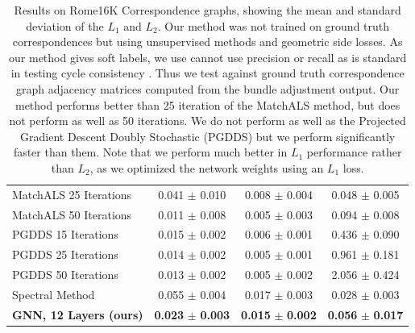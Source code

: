 \documentclass[10pt,twocolumn,letterpaper]{article}
\begin{document}
\begin{table}
\begin{center}
\begin{tabular}{|l|c|c|c|}
MatchALS \cite{zhou2015multi} 25 Iterations                              & 0.041 $\pm$ 0.010                   & 0.008 $\pm$ 0.004                   & 0.048 $\pm$ 0.005                   \\
MatchALS \cite{zhou2015multi} 50 Iterations                              & 0.011 $\pm$ 0.008                   & 0.005 $\pm$ 0.003                   & 0.094 $\pm$ 0.008                   \\ \hline
PGDDS \cite{leonardos2016distributed} 15 Iterations                      & 0.015 $\pm$ 0.002                   & 0.006 $\pm$ 0.001                   & 0.436 $\pm$ 0.090                   \\
PGDDS \cite{leonardos2016distributed} 25 Iterations                      & 0.014 $\pm$ 0.002                   & 0.005 $\pm$ 0.001                   & 0.961 $\pm$ 0.181                   \\
PGDDS \cite{leonardos2016distributed} 50 Iterations                      & 0.013 $\pm$ 0.002                   & 0.005 $\pm$ 0.002                   & 2.056 $\pm$ 0.424                   \\ \hline
Spectral Method                                                          & 0.055 $\pm$ 0.004                   & 0.017 $\pm$ 0.003                   & 0.028 $\pm$ 0.003                   \\ \hline
\textbf{GNN, 12 Layers (ours)}                                           & \textbf{0.023} $\pm$ \textbf{0.003} & \textbf{0.015} $\pm$ \textbf{0.002} & \textbf{0.056} $\pm$ \textbf{0.017} \\ \hline
\end{tabular}
\end{center}


\caption{
Results on Rome16K Correspondence graphs, showing the mean and standard deviation of the $L_1$ and $L_2$.
Our method was not trained on ground truth correspondences but using unsupervised methods and geometric side losses.
As our method gives soft labels, we use cannot use precision or recall as is standard in testing cycle consistency \cite{zhou2015multi}.
Thus we test against ground truth correspondence graph adjacency matrices computed from the bundle adjustment output.
Our method performs better than 25 iteration of the MatchALS \cite{zhou2015multi} method, but does not perform as well as 50 iterations.
We do not perform as well as the Projected Gradient Descent Doubly Stochastic (PGDDS) \cite{leonardos2016distributed} but we perform significantly faster than them.
Note that we perform much better in $L_1$ performance rather than $L_2$, as we optimized the network weights using an $L_1$ loss.
}
\end{table}
\end{document}
